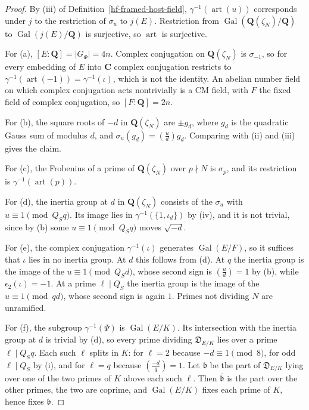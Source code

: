 \begin{proof}
By (iii) of Definition~\ref{hf-framed-host-field}, $\gamma^{-1}(\operatorname{art}(u))$ corresponds
under $j$ to the restriction of $\sigma_u$ to $j(E)$. Restriction from
$\operatorname{Gal}(\mathbf Q(\zeta_N)/\mathbf Q)$ to $\operatorname{Gal}(j(E)/\mathbf Q)$ is
surjective, so $\operatorname{art}$ is surjective.

For (a), $[E:\mathbf Q]=|G_\Phi|=4n$. Complex conjugation on $\mathbf Q(\zeta_N)$ is $\sigma_{-1}$, so
for every embedding of $E$ into $\mathbf C$ complex conjugation restricts to
$\gamma^{-1}(\operatorname{art}(-1))=\gamma^{-1}(\iota)$, which is not the identity. An abelian
number field on which complex conjugation acts nontrivially is a CM field, with $F$ the fixed field
of complex conjugation, so $[F:\mathbf Q]=2n$.

For (b), the square roots of $-d$ in $\mathbf Q(\zeta_N)$ are $\pm g_d$, where $g_d$ is the
quadratic Gauss sum of modulus $d$, and $\sigma_u(g_d)=\left(\frac ud\right)g_d$. Comparing with
(ii) and (iii) gives the claim.

For (c), the Frobenius of a prime of $\mathbf Q(\zeta_N)$ over $p\nmid N$ is $\sigma_p$, and its
restriction is $\gamma^{-1}(\operatorname{art}(p))$.

For (d), the inertia group at $d$ in $\mathbf Q(\zeta_N)$ consists of the $\sigma_u$ with
$u\equiv1\pmod{Q_Sq}$. Its image lies in $\gamma^{-1}(\{1,\iota_d\})$ by (iv), and it is not
trivial, since by (b) some $u\equiv1\pmod{Q_Sq}$ moves $\sqrt{-d}$.

For (e), the complex conjugation $\gamma^{-1}(\iota)$ generates $\operatorname{Gal}(E/F)$, so it
suffices that $\iota$ lies in no inertia group. At $d$ this follows from (d). At $q$ the inertia
group is the image of the $u\equiv1\pmod{Q_Sd}$, whose second sign is $\left(\frac ud\right)=1$ by
(b), while $\epsilon_2(\iota)=-1$. At a prime $\ell\mid Q_S$ the inertia group is the image of
the $u\equiv1\pmod{qd}$, whose second sign is again $1$. Primes not dividing $N$ are unramified.

For (f), the subgroup $\gamma^{-1}(\Psi)$ is $\operatorname{Gal}(E/K)$. Its intersection with the
inertia group at $d$ is trivial by (d), so every prime dividing $\mathfrak D_{E/K}$ lies over a
prime $\ell\mid Q_Sq$. Each such $\ell$ splits in $K$: for $\ell=2$ because $-d\equiv1\pmod8$, for
odd $\ell\mid Q_S$ by (i), and for $\ell=q$ because $\left(\frac{-d}{q}\right)=1$. Let
$\mathfrak b$ be the part of $\mathfrak D_{E/K}$ lying over one of the two primes of $K$ above each
such $\ell$. Then $\bar{\mathfrak b}$ is the part over the other primes, the two are coprime, and
$\operatorname{Gal}(E/K)$ fixes each prime of $K$, hence fixes $\mathfrak b$.
\end{proof}

